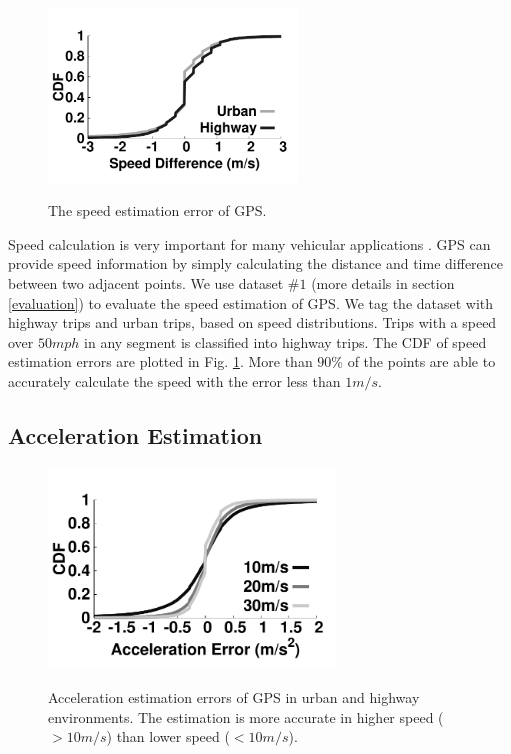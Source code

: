 \begin{figure}[!htbp]
\begin{center}
\includegraphics[width=2.6in,angle=0]{Figs/DriveSense/gpsobd_speed_diff.pdf}
\vspace{-0.2cm}
\caption{The speed estimation error of GPS.}
\vspace{-0.2cm}
\label{speeddiff}
\end{center}
\end{figure}

Speed calculation is very important for many vehicular applications \cite{hansenspeed, chandrasekaran2010vehicular}.  
GPS can provide speed information by simply calculating
the distance and time difference between two adjacent points. 
We use dataset $\#1$ (more details in section \ref{evaluation}) to evaluate the speed estimation of GPS. 
We tag the dataset with highway trips and urban trips,
based on speed distributions. 
Trips with a speed over $50mph$ in any segment is classified into highway trips. 
The CDF of speed estimation errors are plotted in Fig. \ref{speeddiff}. 
More than $90\%$ of the points are able to accurately calculate the speed 
with the error less than $1m/s$. 


\subsection{Acceleration Estimation}



\begin{figure}[!tb]
\begin{center}
\includegraphics[width=3.0in,angle=0]{Figs/DriveSense/gpsobd_acce_speed.pdf}
\vspace{-0.2cm}
\caption{Acceleration estimation errors of GPS in urban and highway environments. 
	The estimation is more accurate in higher speed ($>10m/s$) than lower speed ($<10m/s$).}
\vspace{-0.2cm}
\label{accediff}
\end{center}
\end{figure}


